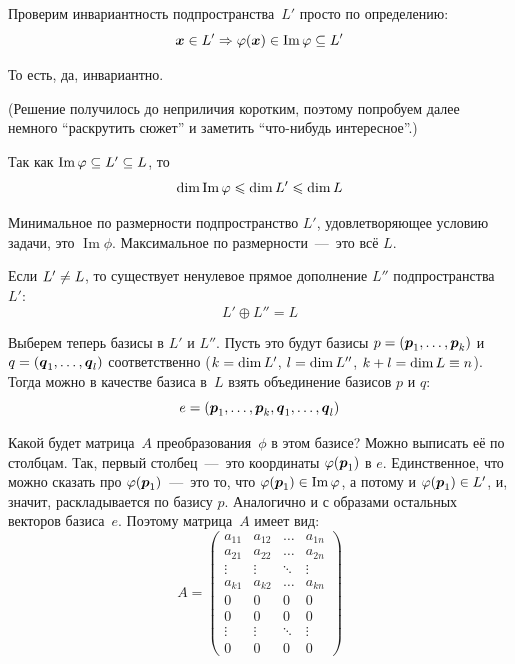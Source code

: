 \documentclass[a4paper,12pt]{article}
\DeclareMathOperator{\Imag}{Im}
\begin{document}
  \begin{solution}
    Проверим инвариантность подпространства~$L'$ просто по определению:
    \[
      \bds x \hm\in L' \Rightarrow \phi(\bds x) \in \Imag\phi \subseteq L'
    \]
    
    То есть, да, инвариантно.
    
    (Решение получилось до неприличия коротким, поэтому попробуем далее немного ``раскрутить сюжет'' и заметить ``что-нибудь интересное''.)
    
    Так как $\Imag\phi \hm\subseteq L' \hm\subseteq L$, то
    \[
      \dim\Imag\phi \hm\leq \dim L' \hm\leq \dim L
    \]
    
    Минимальное по размерности подпространство $L'$, удовлетворяющее условию задачи, это $\Imag\phi$.
    Максимальное по размерности~---~это всё $L$.
    
    Если $L' \hm{\not=} L$, то существует ненулевое прямое дополнение $L''$ подпространства $L'$:
    \[
      L' \oplus L'' = L
    \]
    
    Выберем теперь базисы в $L'$ и $L''$.
    Пусть это будут базисы $p = (\boldsymbol p_1, \ldots, \boldsymbol p_k)$ и $q \hm= (\bds q_1, \ldots, \bds q_l)$ соответственно ($k \hm= \dim L'$, $l \hm= \dim L''$, $k \hm+ l \hm= \dim L \hm\equiv n$).
    Тогда можно в качестве базиса в~$L$ взять объединение базисов $p$ и $q$:
    \[
      e = (\boldsymbol p_1, \ldots, \boldsymbol p_k, \boldsymbol q_1, \ldots, \boldsymbol q_l)
    \]
    
    Какой будет матрица~$A$ преобразования~$\phi$ в этом базисе?
    Можно выписать её по столбцам.
    Так, первый столбец~---~это координаты $\varphi(\boldsymbol p_1)$ в $e$.
    Единственное, что можно сказать про $\varphi(\boldsymbol p_1)$~---~это то, что $\phi(\bds p_1) \hm\in \Imag\phi$, а потому и $\phi(\bds p_1) \hm\in L'$, и, значит, раскладывается по базису $p$.
    Аналогично и с образами остальных векторов базиса~$e$.
    Поэтому матрица~$A$ имеет вид:
    \[
      A = \begin{pmatrix}
        a_{11} & a_{12} & \ldots & a_{1n}\\
        a_{21} & a_{22} & \ldots & a_{2n}\\
        \vdots & \vdots & \ddots & \vdots\\
        a_{k1} & a_{k2} & \ldots & a_{kn}\\
        0      & 0      & 0      & 0\\
        0      & 0      & 0      & 0\\
        \vdots & \vdots & \ddots & \vdots\\
        0      & 0      & 0      & 0
      \end{pmatrix}
    \]
    

\end{solution}
\end{document}
